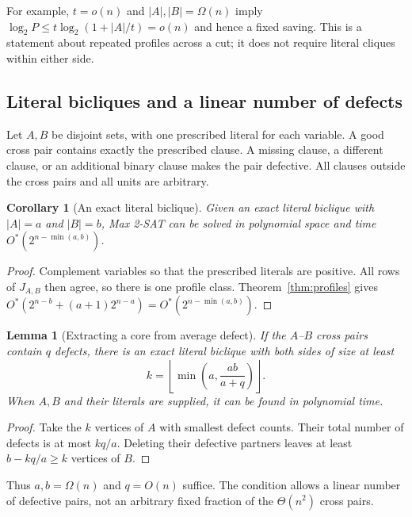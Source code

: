 \documentclass[11pt,a4paper]{article}
\newtheorem{lemma}[theorem]{Lemma}
\newtheorem{corollary}[theorem]{Corollary}
\theoremstyle{definition}
\theoremstyle{remark}
\newcommand{\Ostar}{O^{*}}
\begin{document}
For example, $t=o(n)$ and $|A|,|B|=\Omega(n)$ imply
$\log_2P\le t\log_2(1+|A|/t)=o(n)$ and hence a fixed saving.
This is a statement about repeated profiles across a cut; it does not
require literal cliques within either side.

\subsection{Literal bicliques and a linear number of defects}

Let $A,B$ be disjoint sets, with one prescribed literal for each variable.
A good cross pair contains exactly the prescribed clause. A missing clause,
a different clause, or an additional binary clause makes the pair defective.
All clauses outside the cross pairs and all units are arbitrary.

\begin{corollary}[An exact literal biclique]\label{thm:biclique}
Given an exact literal biclique with $|A|=a$ and $|B|=b$, Max 2-SAT can be
solved in polynomial space and time $\Ostar(2^{n-\min(a,b)})$.
\end{corollary}
\begin{proof}
Complement variables so that the prescribed literals are positive.
All rows of $J_{A,B}$ then agree, so there is one profile class.
Theorem~\ref{thm:profiles} gives
$\Ostar(2^{n-b}+(a+1)2^{n-a})=\Ostar(2^{n-\min(a,b)})$.
\end{proof}

\begin{lemma}[Extracting a core from average defect]\label{lem:core}
If the $A$--$B$ cross pairs contain $q$ defects, there is an exact literal
biclique with both sides of size at least
\[
 k=\left\lfloor\min\left(a,\frac{ab}{a+q}\right)\right\rfloor.
\]
When $A,B$ and their literals are supplied, it can be found in polynomial time.
\end{lemma}
\begin{proof}
Take the $k$ vertices of $A$ with smallest defect counts. Their total number
of defects is at most $kq/a$. Deleting their defective partners leaves at
least $b-kq/a\ge k$ vertices of $B$.
\end{proof}

Thus $a,b=\Omega(n)$ and $q=O(n)$ suffice. The condition allows a linear
number of defective pairs, not an arbitrary fixed fraction of the
$\Theta(n^2)$ cross pairs.
\end{document}
